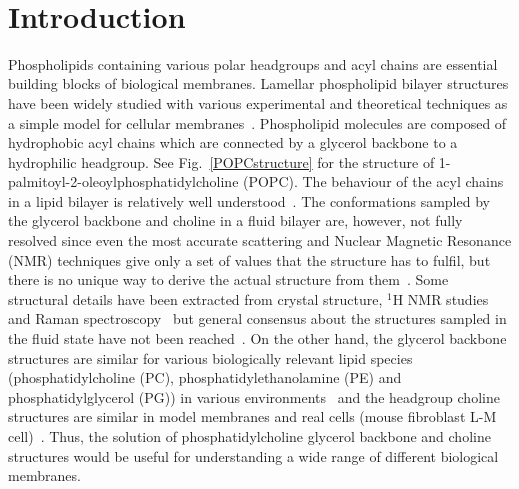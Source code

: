 \documentclass[pre,aps,floatfix,authordate1-4,twocolumn]{revtex4-1}
\begin{document}
~\vspace{0.3cm}\\
{\it \bf} 

\section{Introduction}

Phospholipids containing various polar headgroups and acyl chains are essential building blocks of 
biological membranes. Lamellar phospholipid bilayer structures have been widely studied with various experimental 
and theoretical techniques as a simple model for cellular membranes~\cite{lipowsky95,tieleman97,klauda08,edholm08,tieleman10,piggot12,rabinovich13,marsh13}. 
Phospholipid molecules are composed of hydrophobic acyl chains which are connected by a glycerol backbone to a hydrophilic headgroup.
See Fig.~\ref{POPCstructure} for the structure of 1-palmitoyl-2-oleoylphosphatidylcholine (POPC).
The behaviour of the acyl chains in a lipid bilayer is relatively well understood~\cite{Israelachvili80,lipowsky95,tieleman97,klauda08,edholm08,tieleman10,marsh13}. 
The conformations sampled by the glycerol backbone and choline in a fluid bilayer are, however, not fully 
resolved since even the most accurate scattering and Nuclear Magnetic Resonance (NMR)
techniques give only a set of values that the structure has to fulfil, but
there is no unique way to derive the actual structure from them~\cite{seelig77b,skarjune79,Israelachvili80,jacobs80,davis83,strenk85,akutsu91,hong95b,hong96,semchyschyn04}.
Some structural details have been extracted from crystal structure, $^1$H NMR studies and Raman spectroscopy~\cite{hauser80,hauser81,hauser81b,akutsu81b,pascher92,hauser88,marsh06}
but general consensus about the structures sampled in the fluid state have not been reached~\cite{seelig77b,skarjune79,Israelachvili80,jacobs80,davis83,strenk85,hauser88,akutsu91,hong95b,hong96,semchyschyn04,marsh06}. 
On the other hand, the glycerol backbone structures are similar for various biologically
relevant lipid species (phosphatidylcholine (PC), phosphatidylethanolamine (PE) and phosphatidylglycerol (PG)) 
in various environments~\cite{gally81} and the headgroup choline structures are similar in model membranes and
real cells (mouse fibroblast L-M cell)~\cite{scherer87}.
Thus, the solution of phosphatidylcholine glycerol backbone and choline structures would be 
useful for understanding a wide range of different biological membranes.
\end{document}
